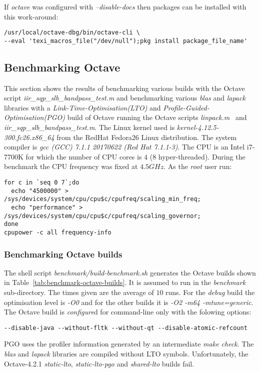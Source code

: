 \documentclass[a4paper,twoside,10pt,english]{report}
\begin{document}
If \emph{octave} was configured with \emph{--disable-docs} then packages can 
be installed with this work-around:
\begin{small}
\begin{verbatim}
/usr/local/octave-dbg/bin/octave-cli \
--eval 'texi_macros_file("/dev/null");pkg install package_file_name'
\end{verbatim}
\end{small}
\subsection*{Benchmarking Octave}
This section shows the results of benchmarking various builds with the
Octave script \emph{iir\_sqp\_slb\_bandpass\_test.m} and benchmarking various
\emph{blas} and \emph{lapack} libraries with a
\emph{Link-Time-Optimisation(LTO)} and \emph{Profile-Guided-Optimisation(PGO)}
build of Octave running the Octave scripts
\emph{linpack.m}~\cite{Rutter_LinpackBenchmark} and
\emph{iir\_sqp\_slb\_bandpass\_test.m}.
The Linux kernel used is \emph{kernel-4.12.5-300.fc26.x86\_64} from the RedHat 
Fedora26 Linux distribution. The system compiler is 
\emph{gcc (GCC) 7.1.1 20170622 (Red Hat 7.1.1-3)}. 
The CPU is an Intel i7-7700K for which the number of CPU cores is $4$ ($8$
hyper-threaded). During the benchmark the CPU frequency was fixed at $4.5GHz$.
As the \emph{root} user run:
\begin{small}
\begin{verbatim}
for c in `seq 0 7`;do 
  echo "4500000" > /sys/devices/system/cpu/cpu$c/cpufreq/scaling_min_freq; 
  echo "performance" > /sys/devices/system/cpu/cpu$c/cpufreq/scaling_governor;
done
cpupower -c all frequency-info
\end{verbatim}
\end{small}
\subsubsection*{Benchmarking Octave builds}
The shell script \emph{benchmark/build-benchmark.sh} generates the Octave builds
shown in Table~\ref{tab:benchmark-octave-builds}. It is assumed to run in the
\emph{benchmark} sub-directory. The times given are the average of $10$ runs.
For the \emph{debug} build the optimisation level is \emph{-O0} and for the
other builds it is \emph{-O2 -m64 -mtune=generic}. The Octave
build is \emph{configure}d for command-line only with the folowing options:
\begin{small}
\begin{verbatim}
--disable-java --without-fltk --without-qt --disable-atomic-refcount
\end{verbatim}
\end{small}
PGO uses the profiler information generated by an intermediate
\emph{make check}. The \emph{blas} and \emph{lapack} libraries are compiled
without LTO symbols. Unfortunately, the Octave-4.2.1 \emph{static-lto},
\emph{static-lto-pgo} and \emph{shared-lto} builds fail.
\end{document}

